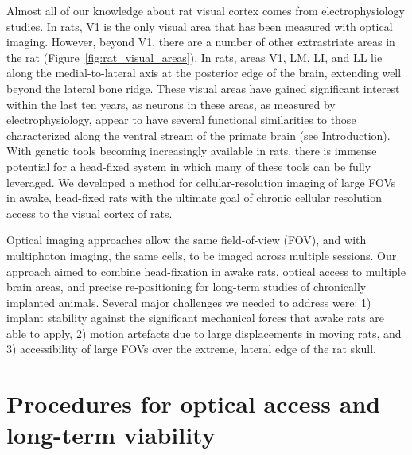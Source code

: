 Almost all of our knowledge about rat visual cortex comes from electrophysiology studies. In rats, V1 is the only visual area that has been measured with optical imaging\cite{Gias2005, Scott2018, Ohki2005}. However, beyond V1, there are a number of other extrastriate areas in the rat\cite{Espinoza1983, Sereno1991} (Figure~\ref{fig:rat_visual_areas}). In rats, areas V1, LM, LI, and LL lie along the medial-to-lateral axis at the posterior edge of the brain, extending well beyond the lateral bone ridge. These visual areas have gained significant interest within the last ten years, as neurons in these areas, as measured by electrophysiology, appear to have several functional similarities to those characterized along the ventral stream of the primate brain (see Introduction). With genetic tools becoming increasingly available in rats, there is immense potential for a head-fixed system in which many of these tools can be fully leveraged. We developed a method for cellular-resolution imaging of large FOVs in awake, head-fixed rats with the ultimate goal of chronic cellular resolution access to the visual cortex of rats. 

Optical imaging approaches allow the same field-of-view (FOV), and with multiphoton imaging, the same cells, to be imaged across multiple sessions. Our approach aimed to combine head-fixation in awake rats, optical access to multiple brain areas, and precise re-positioning for long-term studies of chronically implanted animals. Several major challenges we needed to address were:  1) implant stability against the significant mechanical forces that awake rats are able to apply, 2) motion artefacts due to large displacements in moving rats, and 3) accessibility of large FOVs over the extreme, lateral edge of the rat skull.


\section{Procedures for optical access and long-term viability} 

